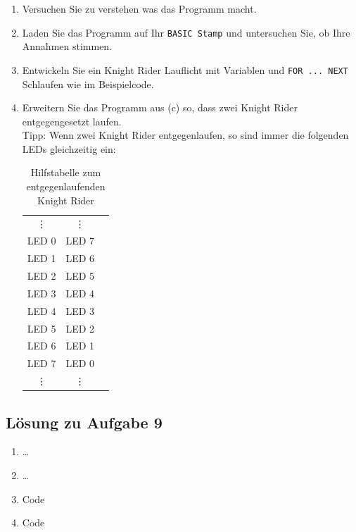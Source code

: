 \begin{enumerate}[label=(\alph*)]
\item Versuchen Sie zu verstehen was das Programm macht.
\item Laden Sie das Programm auf Ihr \verb|BASIC Stamp| und untersuchen Sie,
ob Ihre Annahmen stimmen.
\item Entwickeln Sie ein Knight Rider Lauflicht mit Variablen und 
\lstinline{FOR ... NEXT} Schlaufen wie im Beispielcode.
\item Erweitern Sie das Programm aus (c) so, 
dass zwei Knight Rider entgegengesetzt laufen.\\
\footnotesize
Tipp: Wenn zwei Knight Rider entgegenlaufen, so sind immer
die folgenden LEDs gleichzeitig ein:
\begin{table}[h!]
\centering
\begin{tabular}{ccc}
\vdots & \vdots \\
LED 0 & LED 7 \\
LED 1 & LED 6 \\
LED 2 & LED 5 \\
LED 3 & LED 4 \\
LED 4 & LED 3 \\
LED 5 & LED 2 \\
LED 6 & LED 1 \\
LED 7 & LED 0 \\
\vdots & \vdots  \\
\end{tabular}
\caption{Hilfstabelle zum entgegenlaufenden Knight Rider}
\end{table}
\normalsize
\end{enumerate}

\ifteacher
\newpage
\subsection{Lösung zu Aufgabe 9}
\begin{enumerate}[label=(\alph*)]
\item \dots
\item \dots
\item Code \\ 
\item Code \\ 
\end{enumerate}
\fi
